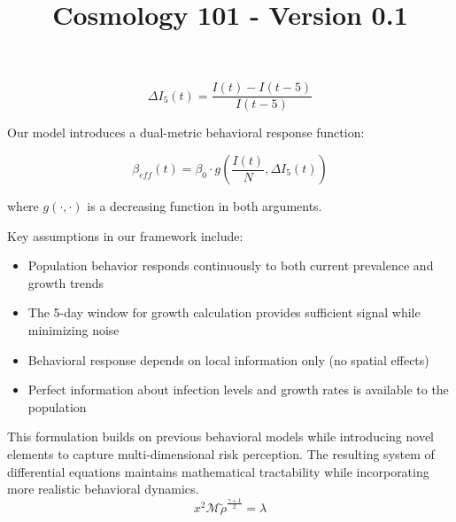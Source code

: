 \documentclass{article}\usepackage{graphicx} \usepackage{amsmath} \usepackage{colortbl}\title{Cosmology 101 - Version 0.1}
\begin{document}
\begin{equation}
\Delta I_5(t) = \frac{I(t) - I(t-5)}{I(t-5)}
\end{equation}

Our model introduces a dual-metric behavioral response function:

\begin{equation}
\beta_{eff}(t) = \beta_0 \cdot g\left(\frac{I(t)}{N}, \Delta I_5(t)\right)
\end{equation}

where $g(\cdot,\cdot)$ is a decreasing function in both arguments.

Key assumptions in our framework include:
\begin{itemize}
    \item Population behavior responds continuously to both current prevalence and growth trends
    \item The 5-day window for growth calculation provides sufficient signal while minimizing noise
    \item Behavioral response depends on local information only (no spatial effects)
    \item Perfect information about infection levels and growth rates is available to the population
\end{itemize}

This formulation builds on previous behavioral models \cite{funk2009spread} while introducing novel elements to capture multi-dimensional risk perception. The resulting system of differential equations maintains mathematical tractability while incorporating more realistic behavioral dynamics. \begin{equation}x^2 \mathcal{M} \tilde{\rho }^{\frac{\gamma +1}{2}}=\lambda \label{Mi ecuacion 8} \end{equation}
\end{document}
